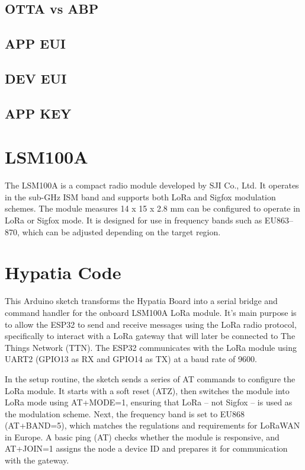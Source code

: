 \subsection{OTTA vs ABP}

\subsection{APP EUI}
\subsection{DEV EUI}
\subsection{APP KEY}


\section{LSM100A}
The LSM100A is a compact radio module developed by SJI Co., Ltd. It operates in the sub-GHz ISM band and supports both LoRa and Sigfox modulation schemes. The module measures 14 x 15 x 2.8 mm can be configured to operate in LoRa or Sigfox mode. It is designed for use in frequency bands such as EU863–870, which can be adjusted depending on the target region.


\section{Hypatia Code}
This Arduino sketch transforms the Hypatia Board into a serial bridge and command handler for the onboard LSM100A LoRa module. It's main purpose is to allow the ESP32 to send and receive messages using the LoRa radio protocol, specifically to interact with a LoRa gateway that will later be connected to The Things Network (TTN). The ESP32 communicates with the LoRa module using UART2 (GPIO13 as RX and GPIO14 as TX) at a baud rate of 9600. 

In the setup routine, the sketch sends a series of AT commands to configure the LoRa module. It starts with a soft reset (ATZ), then switches the module into LoRa mode using AT+MODE=1, ensuring that LoRa – not Sigfox – is used as the modulation scheme. Next, the frequency band is set to EU868 (AT+BAND=5), which matches the regulations and requirements for LoRaWAN in Europe. A basic ping (AT) checks whether the module is responsive, and AT+JOIN=1 assigns the node a device ID and prepares it for communication with the gateway.


